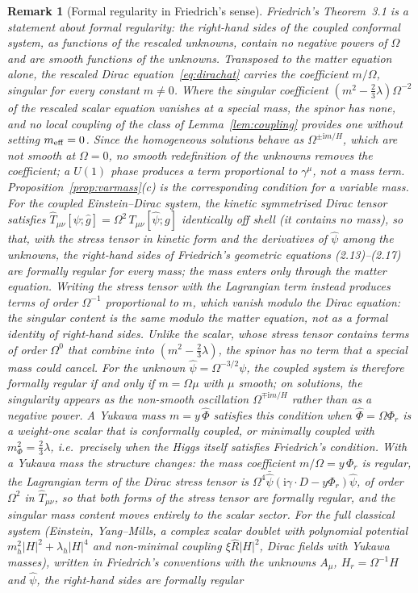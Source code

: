 \documentclass[11pt,a4paper]{article}
\newtheorem{remark}{Remark}
\theoremstyle{definition}
\newcommand{\ii}{\mathrm{i}}
\begin{document}
\begin{remark}[Formal regularity in Friedrich's sense]
\label{rem:friedrich}
Friedrich's Theorem~3.1 \cite{Friedrich2014} is a statement about formal regularity: the right-hand sides of the coupled conformal system, as functions of the rescaled unknowns, contain no negative powers of $\Omega$ and are smooth functions of the unknowns. Transposed to the matter equation alone, the rescaled Dirac equation~\eqref{eq:dirachat} carries the coefficient $m/\Omega$, singular for every constant $m\neq0$. Where the singular coefficient $(m^{2}-\tfrac23\lambda)\Omega^{-2}$ of the rescaled scalar equation vanishes at a special mass, the spinor has none, and no local coupling of the class of Lemma~\ref{lem:coupling} provides one without setting $m_{\rm eff}=0$. Since the homogeneous solutions behave as $\Omega^{\pm\ii m/H}$, which are not smooth at $\Omega=0$, no smooth redefinition of the unknowns removes the coefficient; a $U(1)$ phase produces a term proportional to $\gamma^{\mu}$, not a mass term. Proposition~\ref{prop:varmass}(c) is the corresponding condition for a variable mass. For the coupled Einstein--Dirac system, the kinetic symmetrised Dirac tensor satisfies $\hat T_{\mu\nu}[\psi;\hat g]=\Omega^{2}\,T_{\mu\nu}[\hat\psi;g]$ identically off shell (it contains no mass), so that, with the stress tensor in kinetic form and the derivatives of $\hat\psi$ among the unknowns, the right-hand sides of Friedrich's geometric equations (2.13)--(2.17) are formally regular for every mass; the mass enters only through the matter equation. Writing the stress tensor with the Lagrangian term instead produces terms of order $\Omega^{-1}$ proportional to $m$, which vanish modulo the Dirac equation: the singular content is the same modulo the matter equation, not as a formal identity of right-hand sides. Unlike the scalar, whose stress tensor contains terms of order $\Omega^{0}$ that combine into $(m^{2}-\tfrac23\lambda)$, the spinor has no term that a special mass could cancel. For the unknown $\hat\psi=\Omega^{-3/2}\psi$, the coupled system is therefore formally regular if and only if $m=\Omega\mu$ with $\mu$ smooth; on solutions, the singularity appears as the non-smooth oscillation $\Omega^{\mp\ii m/H}$ rather than as a negative power. A Yukawa mass $m=y\,\hat\Phi$ satisfies this condition when $\hat\Phi=\Omega\Phi_{r}$ is a weight-one scalar that is conformally coupled, or minimally coupled with $m_{\Phi}^{2}=\tfrac23\lambda$, i.e.\ precisely when the Higgs itself satisfies Friedrich's condition. With a Yukawa mass the structure changes: the mass coefficient $m/\Omega=y\,\Phi_{r}$ is regular, the Lagrangian term of the Dirac stress tensor is $\Omega^{4}\bar{\hat\psi}(\ii\gamma\cdot D-y\Phi_{r})\hat\psi$, of order $\Omega^{2}$ in $\hat T_{\mu\nu}$, so that both forms of the stress tensor are formally regular, and the singular mass content moves entirely to the scalar sector. For the full classical system (Einstein, Yang--Mills, a complex scalar doublet with polynomial potential $m_{h}^{2}|H|^{2}+\lambda_{h}|H|^{4}$ and non-minimal coupling $\xi\hat R|H|^{2}$, Dirac fields with Yukawa masses), written in Friedrich's conventions with the unknowns $A_{\mu}$, $H_{r}=\Omega^{-1}H$ and $\hat\psi$, the right-hand sides are formally regular 
\end{remark}
\end{document}
